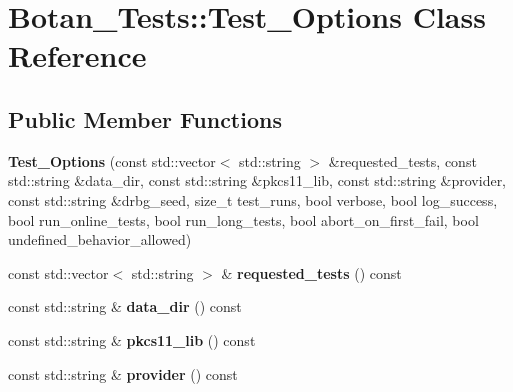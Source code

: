 \hypertarget{class_botan___tests_1_1_test___options}{}\section{Botan\+\_\+\+Tests\+:\+:Test\+\_\+\+Options Class Reference}
\label{class_botan___tests_1_1_test___options}
\subsection*{Public Member Functions}
\begin{DoxyCompactItemize}
\item 
\mbox{\label{class_botan___tests_1_1_test___options_ab1ca783fc0a188c49fe144caa87d8c14}} 
{\bfseries Test\+\_\+\+Options} (const std\+::vector$<$ std\+::string $>$ \&requested\+\_\+tests, const std\+::string \&data\+\_\+dir, const std\+::string \&pkcs11\+\_\+lib, const std\+::string \&provider, const std\+::string \&drbg\+\_\+seed, size\+\_\+t test\+\_\+runs, bool verbose, bool log\+\_\+success, bool run\+\_\+online\+\_\+tests, bool run\+\_\+long\+\_\+tests, bool abort\+\_\+on\+\_\+first\+\_\+fail, bool undefined\+\_\+behavior\+\_\+allowed)
\item 
\mbox{\label{class_botan___tests_1_1_test___options_acbb62d678ae607089be1447652afac88}} 
const std\+::vector$<$ std\+::string $>$ \& {\bfseries requested\+\_\+tests} () const
\item 
\mbox{\label{class_botan___tests_1_1_test___options_a1982c137cd7c722c796c8d8ac5cf4968}} 
const std\+::string \& {\bfseries data\+\_\+dir} () const
\item 
\mbox{\label{class_botan___tests_1_1_test___options_ac992552a2c1d8841b2aca8ff7d12fb09}} 
const std\+::string \& {\bfseries pkcs11\+\_\+lib} () const
\item 
\mbox{\label{class_botan___tests_1_1_test___options_a7ba2ea73db5185cdbdb7f5c82fdcf918}} 
const std\+::string \& {\bfseries provider} () const
\item 
\mbox{\label{class_botan___tests_1_1_test___options_a1744430fd1c5454662360673ef39f3f0}} 

\end{DoxyCompactItemize}
